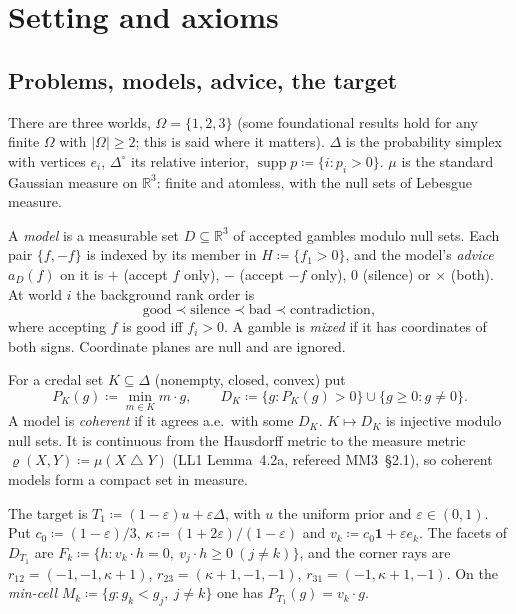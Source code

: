 \documentclass[11pt]{article}
\theoremstyle{definition}
\theoremstyle{remark}
\newcommand{\R}{\mathbb R}
\newcommand{\one}{\mathbf 1}
\newcommand{\Di}{\Delta^{\circ}}
\newcommand{\supp}{\operatorname{supp}}
\newcommand{\sd}{\mathbin{\triangle}}
\newcommand{\src}[1]{\textsf{#1}}
\begin{document}
\section{Setting and axioms}\label{sec:setting}

\subsection{Problems, models, advice, the target}
There are three worlds, $\Omega=\{1,2,3\}$ (some foundational results hold for any finite $\Omega$ with $|\Omega|\ge2$; this is said where it matters). $\Delta$ is the probability simplex with vertices $e_i$, $\Di$ its relative interior, $\supp p\coloneqq\{i:p_i>0\}$. $\mu$ is the standard Gaussian measure on $\R^3$: finite and atomless, with the null sets of Lebesgue measure.

A \emph{model} is a measurable set $D\subseteq\R^3$ of accepted gambles modulo null sets. Each pair $\{f,-f\}$ is indexed by its member in $H\coloneqq\{f_1>0\}$, and the model's \emph{advice} $a_D(f)$ on it is $+$ (accept $f$ only), $-$ (accept $-f$ only), $0$ (silence) or $\times$ (both). At world $i$ the background rank order is
\[
\text{good}\prec\text{silence}\prec\text{bad}\prec\text{contradiction},
\]
where accepting $f$ is good iff $f_i>0$. A gamble is \emph{mixed} if it has coordinates of both signs. Coordinate planes are null and are ignored.

For a credal set $K\subseteq\Delta$ (nonempty, closed, convex) put
\[
P_K(g)\coloneqq\min_{m\in K}m\cdot g,\qquad D_K\coloneqq\{g:P_K(g)>0\}\cup\{g\ge0:g\ne0\}.
\]
A model is \emph{coherent} if it agrees a.e.\ with some $D_K$. $K\mapsto D_K$ is injective modulo null sets. It is continuous from the Hausdorff metric to the measure metric $\varrho(X,Y)\coloneqq\mu(X\sd Y)$ (\src{LL1} Lemma~4.2a, refereed \src{MM3}~\S2.1), so coherent models form a compact set in measure.

The target is $T_1\coloneqq(1-\varepsilon)u+\varepsilon\Delta$, with $u$ the uniform prior and $\varepsilon\in(0,1)$. Put $c_0\coloneqq(1-\varepsilon)/3$, $\kappa\coloneqq(1+2\varepsilon)/(1-\varepsilon)$ and $v_k\coloneqq c_0\one+\varepsilon e_k$. The facets of $D_{T_1}$ are $F_k\coloneqq\{h:v_k\cdot h=0,\ v_j\cdot h\ge0\ (j\ne k)\}$, and the corner rays are $r_{12}=(-1,-1,\kappa+1)$, $r_{23}=(\kappa+1,-1,-1)$, $r_{31}=(-1,\kappa+1,-1)$. On the \emph{min-cell} $M_k\coloneqq\{g:g_k<g_j,\ j\ne k\}$ one has $P_{T_1}(g)=v_k\cdot g$.
\end{document}
